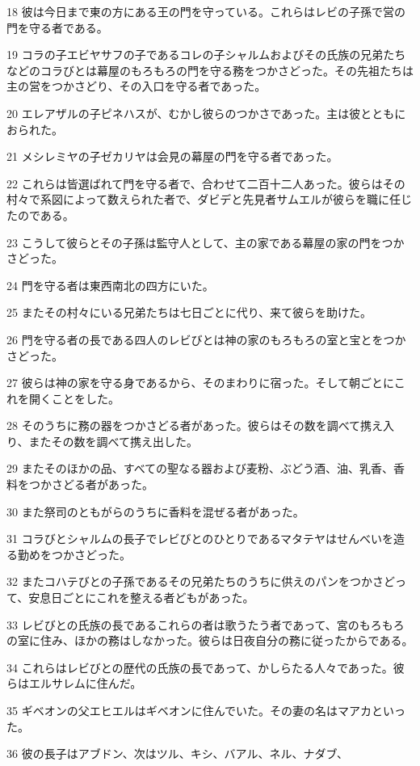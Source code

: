 \par 18 彼は今日まで東の方にある王の門を守っている。これらはレビの子孫で営の門を守る者である。
\par 19 コラの子エビヤサフの子であるコレの子シャルムおよびその氏族の兄弟たちなどのコラびとは幕屋のもろもろの門を守る務をつかさどった。その先祖たちは主の営をつかさどり、その入口を守る者であった。
\par 20 エレアザルの子ピネハスが、むかし彼らのつかさであった。主は彼とともにおられた。
\par 21 メシレミヤの子ゼカリヤは会見の幕屋の門を守る者であった。
\par 22 これらは皆選ばれて門を守る者で、合わせて二百十二人あった。彼らはその村々で系図によって数えられた者で、ダビデと先見者サムエルが彼らを職に任じたのである。
\par 23 こうして彼らとその子孫は監守人として、主の家である幕屋の家の門をつかさどった。
\par 24 門を守る者は東西南北の四方にいた。
\par 25 またその村々にいる兄弟たちは七日ごとに代り、来て彼らを助けた。
\par 26 門を守る者の長である四人のレビびとは神の家のもろもろの室と宝とをつかさどった。
\par 27 彼らは神の家を守る身であるから、そのまわりに宿った。そして朝ごとにこれを開くことをした。
\par 28 そのうちに務の器をつかさどる者があった。彼らはその数を調べて携え入り、またその数を調べて携え出した。
\par 29 またそのほかの品、すべての聖なる器および麦粉、ぶどう酒、油、乳香、香料をつかさどる者があった。
\par 30 また祭司のともがらのうちに香料を混ぜる者があった。
\par 31 コラびとシャルムの長子でレビびとのひとりであるマタテヤはせんべいを造る勤めをつかさどった。
\par 32 またコハテびとの子孫であるその兄弟たちのうちに供えのパンをつかさどって、安息日ごとにこれを整える者どもがあった。
\par 33 レビびとの氏族の長であるこれらの者は歌うたう者であって、宮のもろもろの室に住み、ほかの務はしなかった。彼らは日夜自分の務に従ったからである。
\par 34 これらはレビびとの歴代の氏族の長であって、かしらたる人々であった。彼らはエルサレムに住んだ。
\par 35 ギベオンの父エヒエルはギベオンに住んでいた。その妻の名はマアカといった。
\par 36 彼の長子はアブドン、次はツル、キシ、バアル、ネル、ナダブ、

